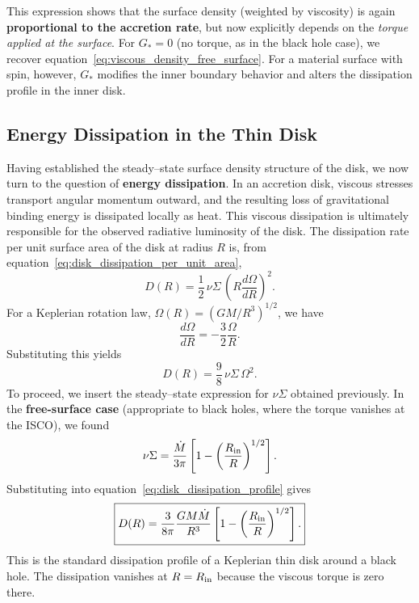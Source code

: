This expression shows that the surface density (weighted by viscosity) is again \textbf{proportional to the accretion rate}, but now explicitly depends on the \emph{torque applied at the surface}. For $G_*=0$ (no torque, as in the black hole case), we recover equation~\eqref{eq:viscous_density_free_surface}. For a material surface with spin, however, $G_*$ modifies the inner boundary behavior and alters the dissipation profile in the inner disk.
\vspace{10pt}
\subsection{Energy Dissipation in the Thin Disk}
Having established the steady--state surface density structure of the disk, we now turn to the question of 
\textbf{energy dissipation}. In an accretion disk, viscous stresses transport angular momentum outward, and 
the resulting loss of gravitational binding energy is dissipated locally as heat. This viscous dissipation is 
ultimately responsible for the observed radiative luminosity of the disk.
\vspace{0.3cm}
\noindent
The dissipation rate per unit surface area of the disk at radius $R$ is, from equation~\eqref{eq:disk_dissipation_per_unit_area},
\begin{equation}
    D(R) = \frac{1}{2}\,\nu\Sigma\,
    \left(R\frac{d\Omega}{dR}\right)^2.
\end{equation}
For a Keplerian rotation law, $\Omega(R) = (GM/R^3)^{1/2}$, we have
\[
\frac{d\Omega}{dR} = -\frac{3}{2}\frac{\Omega}{R}.
\]
Substituting this yields
\begin{equation}
    \label{eq:disk_dissipation_profile}
    \boxed{
    D(R) = \frac{9}{8}\,\nu\Sigma\,\Omega^2.
    }
\end{equation}
\vspace{0.3cm}
\noindent
To proceed, we insert the steady--state expression for $\nu\Sigma$ obtained previously.  
In the \textbf{free-surface case} (appropriate to black holes, where the torque vanishes at the ISCO), 
we found
\[
\nu\Sigma = \frac{\dot{M}}{3\pi}
\left[1 - \left(\frac{R_{\rm in}}{R}\right)^{1/2}\right].
\]
Substituting into equation~\eqref{eq:disk_dissipation_profile} gives
\begin{equation}
\label{eq:free_surface_disip_rate}
\boxed{
D(R) = \frac{3}{8\pi}\frac{GM\dot{M}}{R^3}
\left[1 - \left(\frac{R_{\rm in}}{R}\right)^{1/2}\right].
}
\end{equation}
This is the standard dissipation profile of a Keplerian thin disk around a black hole.  
The dissipation vanishes at $R=R_{\rm in}$ because the viscous torque is zero there.


